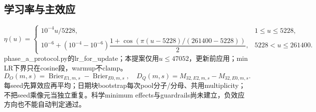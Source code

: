 \documentclass[UTF8,fontset=fandol,10pt]{ctexart}
\begin{document}
\subsection{学习率与主效应}
\[
\eta(u)=\begin{cases}
10^{-4}u/5228,&1\le u\le5228,\\
10^{-6}+(10^{-4}-10^{-6})\dfrac{1+\cos(\pi(u-5228)/(261400-5228))}{2},&5228<u\le261400.
\end{cases}
\]
phase\_a\_protocol.py的lr\_for\_update；本提案仅用\(u\le47052\)，更新前应用；min LR下界只在cosine段，warmup不clamp。
\[
D_O(m,s)=\operatorname{Brier}_{E1,m,s}-\operatorname{Brier}_{E0,m,s},\quad
D_Q(m,s)=M_{32,E2,m,s}-M_{32,E0,m,s}.
\]
每seed先算效应再平均；日期块bootstrap每次pool分子/分母、共用multiplicity；不把seed乘像元当独立重复。科学minimum effects与guardrails尚未建立，负效应方向也不能自动判定通过。
\end{document}
